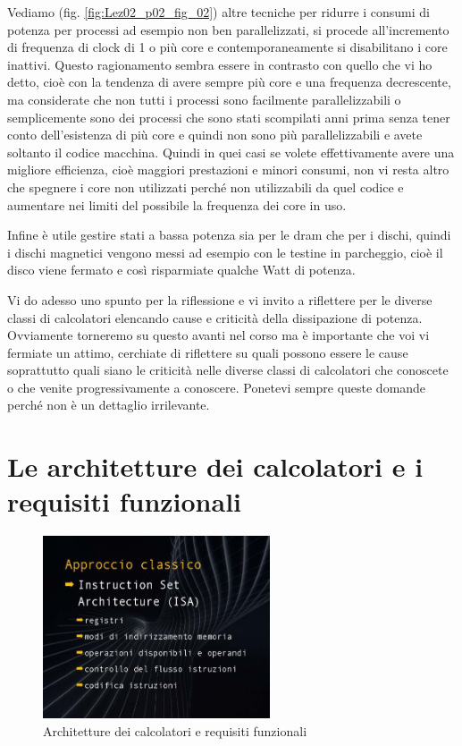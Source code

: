 Vediamo (fig. \ref{fig:Lez02_p02_fig_02}) altre tecniche per ridurre i consumi di potenza per processi ad esempio non ben parallelizzati, si procede all'incremento di frequenza di clock di 1 o più core e contemporaneamente si disabilitano i core inattivi.
Questo ragionamento sembra essere in contrasto con quello che vi ho detto, cioè con la tendenza di avere sempre più core e una frequenza decrescente, ma considerate che non tutti i processi sono facilmente parallelizzabili o semplicemente sono dei processi che sono stati scompilati anni prima senza tener conto dell'esistenza di più core e quindi non sono più parallelizzabili e avete soltanto il codice macchina.
Quindi in quei casi se volete effettivamente avere una migliore efficienza, cioè maggiori prestazioni e minori consumi, non vi resta altro che spegnere i core non utilizzati perché non utilizzabili da quel codice e aumentare nei limiti del possibile la frequenza dei core in uso.

Infine è utile gestire stati a bassa potenza sia per le dram che per i dischi, quindi i dischi magnetici vengono messi ad esempio con le testine in parcheggio, cioè il disco viene fermato e così risparmiate qualche Watt di potenza.

Vi do adesso uno spunto per la riflessione e vi invito a riflettere per le diverse classi di calcolatori elencando cause e criticità della dissipazione di potenza.
Ovviamente torneremo su questo avanti nel corso ma è importante che voi vi fermiate un attimo, cerchiate di riflettere su quali possono essere le cause soprattutto quali siano le criticità nelle diverse classi di calcolatori che conoscete o che venite progressivamente a conoscere. Ponetevi sempre queste domande perché non è un dettaglio irrilevante.

\section{Le architetture dei calcolatori e i requisiti funzionali}

\FloatBarrier
\begin{figure}[H]
  \centering
  \includegraphics[width=0.6\textwidth,
                    trim=40 40 45 40, %
                    clip]{images/Lez02_p02_fig_05.png}
  \caption{Architetture dei calcolatori e requisiti funzionali}
  \label{fig:Lez02_p02_fig_05}
\end{figure}
\FloatBarrier
\noindent

